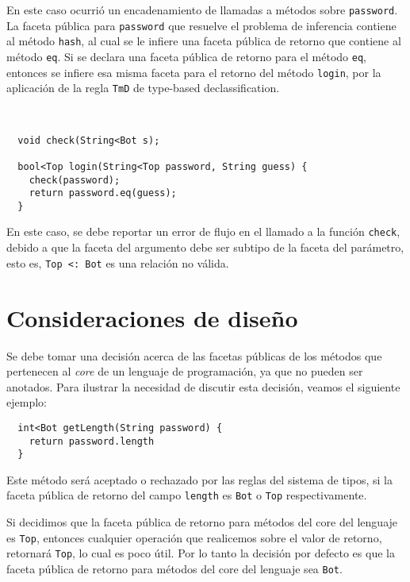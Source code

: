 En este caso ocurrió un encadenamiento de llamadas a métodos sobre \texttt{password}. La faceta pública para \texttt{password} que resuelve el problema de inferencia contiene al método \texttt{hash}, al cual se le infiere una faceta pública de retorno que contiene al método \texttt{eq}. Si se declara una faceta pública de retorno para el método \texttt{eq}, entonces se infiere esa misma faceta para el retorno del método \texttt{login}, por la aplicación de la regla \texttt{TmD} de type-based declassification.

\begin{ej} \ \\
  \normalfont
\begin{lstlisting}
  void check(String<Bot s);

  bool<Top login(String<Top password, String guess) {
    check(password);
    return password.eq(guess);
  }
\end{lstlisting}
\end{ej}

En este caso, se debe reportar un error de flujo en el llamado a la función \texttt{check}, debido a que la faceta del argumento debe ser subtipo de la faceta del parámetro, esto es, \texttt{Top <: Bot} es una relación no válida.

\section{Consideraciones de diseño}

Se debe tomar una decisión acerca de las facetas públicas de los métodos que pertenecen al \emph{core} de un lenguaje de programación, ya que no pueden ser anotados. Para ilustrar la necesidad de discutir esta decisión, veamos el siguiente ejemplo:

\begin{lstlisting}
  int<Bot getLength(String password) {
    return password.length
  }
\end{lstlisting}

Este método será aceptado o rechazado por las reglas del sistema de tipos, si la faceta pública de retorno del campo \texttt{length} es \texttt{Bot} o \texttt{Top} respectivamente.

Si decidimos que la faceta pública de retorno para métodos del core del lenguaje es \texttt{Top}, entonces cualquier operación que realicemos sobre el valor de retorno, retornará \texttt{Top}, lo cual es poco útil. Por lo tanto la decisión por defecto es que la faceta pública de retorno para métodos del core del lenguaje sea \texttt{Bot}.

